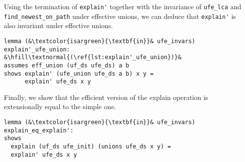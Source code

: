 \documentclass[
  sigplan,
  10pt,
  anonymous,
  review,
  ]{acmart}
\newcommand{\opexplain}{explain}
\begin{document}
Using the termination of \lstinline|explain'| together with the invariance of \lstinline|ufe_lca| and \lstinline|find_newest_on_path| under effective unions, we can deduce that \lstinline|explain'| is also invariant under effective unions.
\begin{lstlisting}[caption={[empty]}, label={lst:explain'_ufe_union}]
lemma (&\textcolor{isargreen}{\textbf{in}}& ufe_invars) explain'_ufe_union: &\hfill\textnormal{(\ref{lst:explain'_ufe_union})}&
assumes eff_union (uf_ds ufe_ds) a b
shows explain' (ufe_union ufe_ds a b) x y =
      explain' ufe_ds x y
\end{lstlisting}
Finally, we show that the efficient version of the \opexplain{} operation is extensionally equal to the simple one.
\begin{lstlisting}
lemma (&\textcolor{isargreen}{\textbf{in}}& ufe_invars) explain_eq_explain':
shows
  explain (uf_ds ufe_init) (unions ufe_ds x y) =
  explain' ufe_ds x y
\end{lstlisting}
\end{document}
